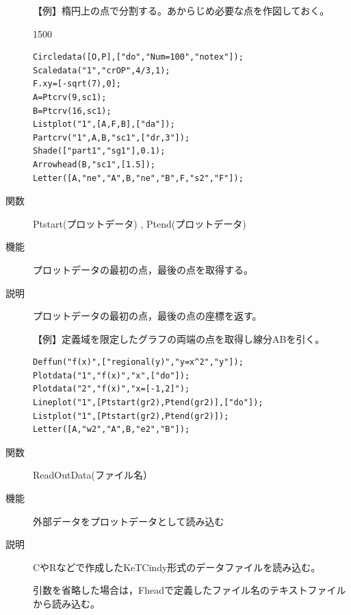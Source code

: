 \documentclass[papersize,a4paper,10pt,uplatex]{jsarticle}
\begin{document}
\begin{description}
\vspace{\baselineskip}
【例】楕円上の点で分割する。あからじめ必要な点を作図しておく。

\begin{layer}{150}{0}
\end{layer}
\begin{verbatim}
Circledata([O,P],["do","Num=100","notex"]);
Scaledata("1","crOP",4/3,1);
F.xy=[-sqrt(7),0];
A=Ptcrv(9,sc1);
B=Ptcrv(16,sc1);
Listplot("1",[A,F,B],["da"]);
Partcrv("1",A,B,"sc1",["dr,3"]);
Shade(["part1","sg1"],0.1);
Arrowhead(B,"sc1",[1.5]);
Letter([A,"ne","A",B,"ne","B",F,"s2","F"]);
\end{verbatim}
 

\vspace{\baselineskip}
\hypertarget{ptstart}{}
\item[関数]Ptstart(プロットデータ) , Ptend(プロットデータ)
\item[機能]プロットデータの最初の点，最後の点を取得する。
\item[説明]プロットデータの最初の点，最後の点の座標を返す。

\vspace{\baselineskip}
【例】定義域を限定したグラフの両端の点を取得し線分ABを引く。
\begin{verbatim}
Deffun("f(x)",["regional(y)","y=x^2","y"]); 
Plotdata("1","f(x)","x",["do"]);
Plotdata("2","f(x)","x=[-1,2]");
Lineplot("1",[Ptstart(gr2),Ptend(gr2)],["do"]);
Listplot("1",[Ptstart(gr2),Ptend(gr2)]);
Letter([A,"w2","A",B,"e2","B"]);
\end{verbatim}
\vspace{\baselineskip}
\begin{center}  \end{center}

\vspace{\baselineskip}
\hypertarget{readoutdata}{}
\item[関数]ReadOutData(ファイル名）
\item[機能]外部データをプロットデータとして読み込む
\item[説明]CやRなどで作成したKeTCindy形式のデータファイルを読み込む。

引数を省略した場合は，Fheadで定義したファイル名のテキストファイルから読み込む。


\end{description}
\end{document}
